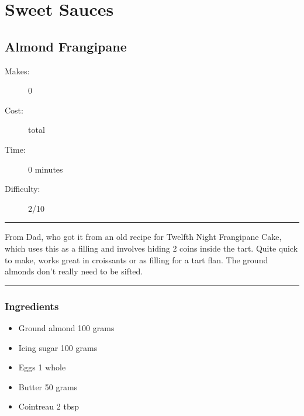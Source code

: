 \documentclass[]{article}
\begin{document}
\section*{\center\Huge\color{accent}Sweet Sauces}
\label{cat:Sweet Sauces}
\label{rec:Almond Frangipane}
\subsection*{\center\huge Almond Frangipane}
\begin{description}
\item[Makes:] 0 
\item[Cost:]  total
\item[Time:] 0 minutes
\item[Difficulty:] 2/10
\end{description}
\vspace{0.2cm}\hrule\vspace{0.5cm}
\begin{adjustwidth}{0.5 cm}{0.5 cm}

From Dad, who got it from an old recipe for Twelfth Night Frangipane Cake, which uses this as a filling and involves hiding 2 coins inside the tart. Quite quick to make, works great in croissants or as filling for a tart flan. The ground almonds don't really need to be sifted. \hfill{}\color{black}

\end{adjustwidth}
\vspace{0.5cm}\hrule
\subsubsection*{\Large Ingredients}
\begin{multicols}{2}
\begin{itemize}
 \item Ground almond \hfill 100 grams
 \item Icing sugar \hfill 100 grams
 \item Eggs \hfill 1 whole
 \item Butter \hfill 50 grams
 \item Cointreau \hfill 2 tbsp
\end{itemize}
\end{multicols}
\end{document}
